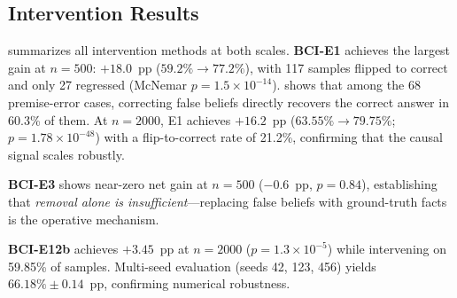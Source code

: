 \subsection{Intervention Results}
\label{sec:intervention}

 summarizes all intervention methods at both scales.
\textbf{BCI-E1} achieves the largest gain at $n{=}500$: $+18.0$~pp ($59.2\%
\to 77.2\%$), with 117 samples flipped to correct and only 27 regressed
(McNemar $p{=}1.5{\times}10^{-14}$).  shows
that among the 68 premise-error cases, correcting false beliefs directly
recovers the correct answer in 60.3\% of them. At $n{=}2000$, E1 achieves $+16.2$~pp
($63.55\% \to 79.75\%$; $p{=}1.78{\times}10^{-48}$) with a flip-to-correct
rate of 21.2\%, confirming that the causal signal scales robustly.

\textbf{BCI-E3} shows near-zero net gain at $n{=}500$ ($-0.6$~pp, $p{=}0.84$),
establishing that \emph{removal alone is insufficient}---replacing false beliefs
with ground-truth facts is the operative mechanism.

\textbf{BCI-E12b} achieves $+3.45$~pp at $n{=}2000$ ($p{=}1.3{\times}10^{-5}$)
while intervening on 59.85\% of samples. Multi-seed evaluation (seeds 42, 123, 456)
yields $66.18\% \pm 0.14$~pp, confirming numerical robustness.

